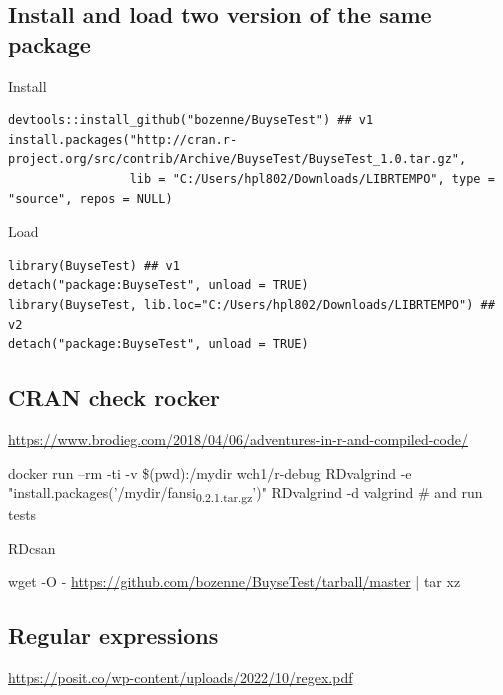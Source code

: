 \documentclass{article}
\begin{document}
\subsection{Install and load two version of the same package}
\label{sec:orgc499782}

Install
\lstset{language=r,label= ,caption= ,captionpos=b,numbers=none}
\begin{lstlisting}
devtools::install_github("bozenne/BuyseTest") ## v1
install.packages("http://cran.r-project.org/src/contrib/Archive/BuyseTest/BuyseTest_1.0.tar.gz", 
                 lib = "C:/Users/hpl802/Downloads/LIBRTEMPO", type = "source", repos = NULL)
\end{lstlisting}

Load 
\lstset{language=r,label= ,caption= ,captionpos=b,numbers=none}
\begin{lstlisting}
library(BuyseTest) ## v1
detach("package:BuyseTest", unload = TRUE)
library(BuyseTest, lib.loc="C:/Users/hpl802/Downloads/LIBRTEMPO") ## v2
detach("package:BuyseTest", unload = TRUE)
\end{lstlisting}

\subsection{CRAN check rocker}
\label{sec:orgb194454}
\url{https://www.brodieg.com/2018/04/06/adventures-in-r-and-compiled-code/}

docker run --rm -ti -v \$(pwd):/mydir wch1/r-debug
RDvalgrind -e "install.packages('/mydir/fansi\textsubscript{0.2.1.tar.gz}')"
RDvalgrind -d valgrind  \# and run tests

RDcsan

wget -O - \url{https://github.com/bozenne/BuyseTest/tarball/master} | tar xz
\subsection{Regular expressions}
\label{sec:orge3bcf41}
\url{https://posit.co/wp-content/uploads/2022/10/regex.pdf}
\end{document}
